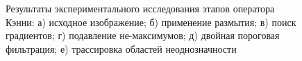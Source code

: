 \begin{figure}[ht!]
\begin{minipage}[h]{0.49\linewidth}
	\end{minipage}
	\caption{Результаты экспериментального исследования этапов оператора Кэнни: а) исходное изображение; б) применение размытия; в) поиск градиентов; г) подавление	не-максимумов; д) двойная пороговая фильтрация; е) трассировка областей неоднозначности}
	\label{fig:canny}
\end{figure}

